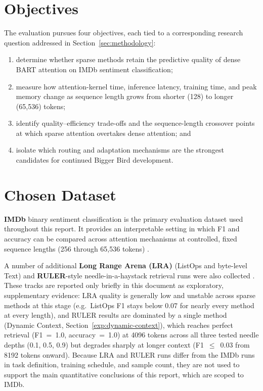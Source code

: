 \documentclass[11pt]{article}
\begin{document}
\section{Objectives}

The evaluation pursues four objectives, each tied to a corresponding research
question addressed in Section~\ref{sec:methodology}:

\begin{enumerate}
  \item determine whether sparse methods retain the predictive quality of dense
  BART attention on IMDb sentiment classification;
  \item measure how attention-kernel time, inference latency, training time,
  and peak memory change as sequence length grows from shorter (128) to longer (65{,}536) tokens;
  \item identify quality--efficiency trade-offs and the sequence-length
  crossover points at which sparse attention overtakes dense attention; and
  \item isolate which routing and adaptation mechanisms are the strongest
  candidates for continued Bigger Bird development.
\end{enumerate}

\section{Chosen Dataset}
\label{sec:dataset}

\textbf{IMDb} binary sentiment classification is the primary evaluation
dataset used throughout this report. It provides an interpretable setting in
which F1 and accuracy can be compared across attention mechanisms at
controlled, fixed sequence lengths (256 through 65{,}536 tokens)
\citep{maas2011imdb}.

A number of additional \textbf{Long Range Arena (LRA)} (ListOps and byte-level
Text) and \textbf{RULER}-style needle-in-a-haystack retrieval runs were also
collected \citep{tay2021lra,hsieh2024ruler}. These tracks are reported only briefly in this document as
exploratory, supplementary evidence: LRA quality is generally low and unstable
across sparse methods at this stage (e.g.\ ListOps F1 stays below 0.07 for
nearly every method at every length), and RULER results are dominated by a
single method (Dynamic Context, Section~\ref{exp:dynamic-context}), which
reaches perfect retrieval (F1~=~1.0, accuracy~=~1.0) at 4096 tokens across all
three tested needle depths (0.1, 0.5, 0.9) but degrades sharply at longer
context (F1~$\leq$~0.03 from 8192 tokens onward). Because LRA and RULER runs
differ from the IMDb runs in task definition, training schedule, and sample
count, they are not used to support the main quantitative conclusions of this
report, which are scoped to IMDb.
\end{document}
